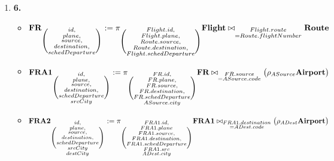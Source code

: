 \begin{enumerate}[label=]
    \newpage
    \item \textbf{6.} 
    \begin{itemize}[label=]
        \item $\textbf{FR}_{\Bigg( \substack{id,\\ plane, \\ source,\\ destination,\\ schedDeparture} \Bigg)}:= \pi_{\Bigg( \substack{Flight.id,\\ Flight.plane, \\ Route.source,\\ Route.destination,\\ Flight.schedDeparture} \Bigg)} \textbf{Flight} \bowtie_{\substack{Flight.route\\ = Route.flightNumber}} \textbf{Route}$ 

        \item $\textbf{FRA1}_{\Bigg( \substack{id,\\ plane, \\ source,\\ destination,\\ schedDeparture \\ srcCity} \Bigg)} := \pi_{\Bigg( \substack{FR.id,\\FR.plane, \\ FR.source,\\ FR.destination,\\ FR.schedDeparture \\ ASource.city} \Bigg)}\textbf{FR} \bowtie_{\substack{FR.source\\ = ASource.code}} \big(\rho_{ASource} \textbf{Airport}\big)$

        \item $\textbf{FRA2}_{\Bigg( \substack{id,\\ plane, \\ source,\\ destination,\\ schedDeparture \\ srcCity \\ destCity} \Bigg)} := \pi_{\Bigg( \substack{FRA1.id,\\ FRA1.plane \\ FRA1.source,\\ FRA1.destination,\\ FRA1.schedDeparture \\ FRA1.src \\ ADest.city} \Bigg)}\textbf{FRA1} \bowtie_{\substack{FRA1.destination\\ = ADest.code}} \big(\rho_{ADest} \textbf{Airport}\big)$


\end{itemize}
\end{enumerate}
